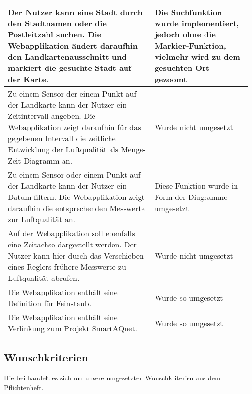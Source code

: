 \begin{tabularx}{\textwidth}{| X | X |}
    \hline
    Der Nutzer kann eine Stadt durch den Stadtnamen oder die Postleitzahl suchen. Die Webapplikation ändert daraufhin den Landkartenausschnitt und markiert die gesuchte Stadt auf der Karte. & Die Suchfunktion wurde implementiert, jedoch ohne die Markier-Funktion, vielmehr wird zu dem gesuchten Ort gezoomt \\
    \hline
    Zu einem Sensor der einem Punkt auf der Landkarte kann der Nutzer ein Zeitintervall angeben. Die Webapplikation zeigt daraufhin für das gegebenen Intervall die zeitliche Entwicklung der Luftqualität als Menge-Zeit Diagramm an. & Wurde nicht umgesetzt \\
    \hline
    Zu einem Sensor oder einem Punkt auf der Landkarte kann der Nutzer ein Datum filtern. Die Webapplikation zeigt daraufhin die entsprechenden Messwerte zur Luftqualität an. & Diese Funktion wurde in Form der Diagramme umgesetzt \\
    \hline
    Auf der Webapplikation soll ebenfalls eine Zeitachse dargestellt werden. Der Nutzer kann hier durch das Verschieben eines Reglers frühere Messwerte zu Luftqualität abrufen.  & Wurde nicht umgesetzt \\
    \hline
    Die Webapplikation enthält eine Definition für \gls{Feinstaub}. & Wurde so umgesetzt \\
    \hline
    Die Webapplikation enthält eine Verlinkung zum Projekt SmartAQnet. & Wurde so umgesetzt \\   
    \hline 
    \end{tabularx}
\subsection{Wunschkriterien}
    Hierbei handelt es sich um unsere umgesetzten Wunschkriterien aus dem Pflichtenheft.
    
